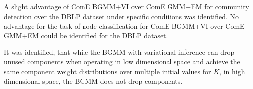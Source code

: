 \documentclass[conference]{IEEEtran}
\begin{document}
A slight advantage of ComE BGMM+VI over ComE GMM+EM for community detection over the DBLP dataset under specific conditions was identified. No advantage for the task of node classification for ComE BGMM+VI over ComE GMM+EM could be identified for the DBLP dataset.

It was identified, that while the BGMM with variational inference can drop unused components when operating in low dimensional space and achieve the same component weight distributions over multiple initial values for $K$, in high dimensional space, the BGMM does not drop components.





















\end{document}
